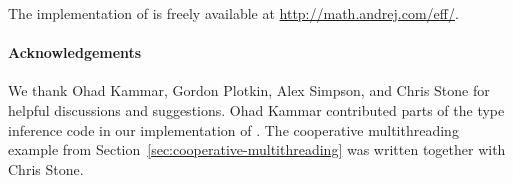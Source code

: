 The implementation of \eff is freely available at \url{http://math.andrej.com/eff/}.

\paragraph{Acknowledgements}
\label{sec:acknowledgment}

We thank Ohad Kammar, Gordon Plotkin, Alex Simpson, and Chris
Stone for helpful discussions and suggestions. Ohad Kammar contributed parts of
the type inference code in our implementation of \eff. The cooperative
multithreading example from Section~\ref{sec:cooperative-multithreading} was
written together with Chris Stone.



